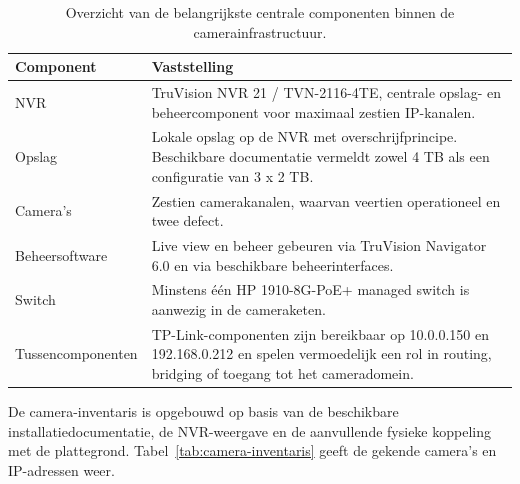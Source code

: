 \begin{table}[H]
    \centering
    \small
    \caption[Overzicht van centrale componenten]{Overzicht van de belangrijkste centrale componenten binnen de camerainfrastructuur.}
    \label{tab:centrale-assets}
    \begin{tabular}{|p{}|p{}|}
        \hline
        \textbf{Component} & \textbf{Vaststelling} \\
        \hline
        NVR & TruVision NVR 21 / TVN-2116-4TE, centrale opslag- en beheercomponent voor maximaal zestien IP-kanalen. \\
        \hline
        Opslag & Lokale opslag op de NVR met overschrijfprincipe. Beschikbare documentatie vermeldt zowel 4 TB als een configuratie van 3 x 2 TB. \\
        \hline
        Camera's & Zestien camerakanalen, waarvan veertien operationeel en twee defect. \\
        \hline
        Beheersoftware & Live view en beheer gebeuren via TruVision Navigator 6.0 en via beschikbare beheerinterfaces. \\
        \hline
        Switch & Minstens één HP 1910-8G-PoE+ managed switch is aanwezig in de cameraketen. \\
        \hline
        Tussencomponenten & TP-Link-componenten zijn bereikbaar op 10.0.0.150 en 192.168.0.212 en spelen vermoedelijk een rol in routing, bridging of toegang tot het cameradomein. \\
        \hline
    \end{tabular}
\end{table}

De camera-inventaris is opgebouwd op basis van de beschikbare installatiedocumentatie, de NVR-weergave en de aanvullende fysieke koppeling met de plattegrond. Tabel~\ref{tab:camera-inventaris} geeft de gekende camera's en IP-adressen weer.

